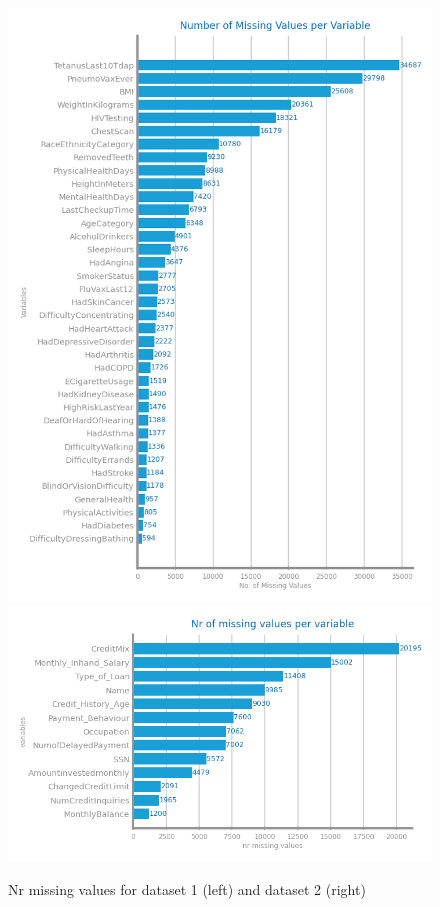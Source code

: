 \documentclass[10pt]{extarticle}
\begin{document}
\begin{figure}[H]
  \includegraphics[scale=0.6]{images/dataset1/data_profiling/CovidPos_mv.png}
  \centering\includegraphics[scale=0.6]{images/dataset2/data_profiling/Credit_Score_mv.png}
\caption{Nr missing values for dataset 1 (left) and dataset 2 (right)}
\end{figure}
\end{document}
